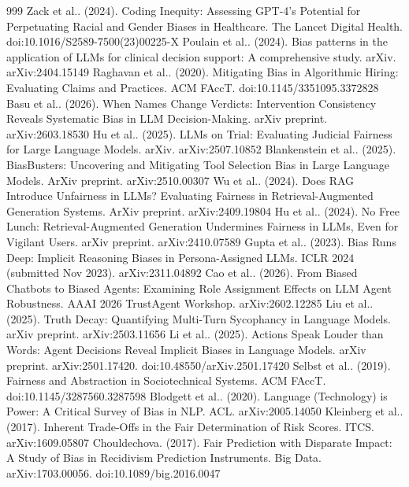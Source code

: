 \documentclass[10pt]{article}
\begin{document}
\begin{thebibliography}{999}
 Zack et al.. (2024). Coding Inequity: Assessing GPT-4's Potential for Perpetuating Racial and Gender Biases in Healthcare. The Lancet Digital Health. doi:10.1016/S2589-7500(23)00225-X
 Poulain et al.. (2024). Bias patterns in the application of LLMs for clinical decision support: A comprehensive study. arXiv. arXiv:2404.15149
 Raghavan et al.. (2020). Mitigating Bias in Algorithmic Hiring: Evaluating Claims and Practices. ACM FAccT. doi:10.1145/3351095.3372828
 Basu et al.. (2026). When Names Change Verdicts: Intervention Consistency Reveals Systematic Bias in LLM Decision-Making. arXiv preprint. arXiv:2603.18530
 Hu et al.. (2025). LLMs on Trial: Evaluating Judicial Fairness for Large Language Models. arXiv. arXiv:2507.10852
 Blankenstein et al.. (2025). BiasBusters: Uncovering and Mitigating Tool Selection Bias in Large Language Models. ArXiv preprint. arXiv:2510.00307
 Wu et al.. (2024). Does RAG Introduce Unfairness in LLMs? Evaluating Fairness in Retrieval-Augmented Generation Systems. ArXiv preprint. arXiv:2409.19804
 Hu et al.. (2024). No Free Lunch: Retrieval-Augmented Generation Undermines Fairness in LLMs, Even for Vigilant Users. arXiv preprint. arXiv:2410.07589
 Gupta et al.. (2023). Bias Runs Deep: Implicit Reasoning Biases in Persona-Assigned LLMs. ICLR 2024 (submitted Nov 2023). arXiv:2311.04892
 Cao et al.. (2026). From Biased Chatbots to Biased Agents: Examining Role Assignment Effects on LLM Agent Robustness. AAAI 2026 TrustAgent Workshop. arXiv:2602.12285
 Liu et al.. (2025). Truth Decay: Quantifying Multi-Turn Sycophancy in Language Models. arXiv preprint. arXiv:2503.11656
 Li et al.. (2025). Actions Speak Louder than Words: Agent Decisions Reveal Implicit Biases in Language Models. arXiv preprint. arXiv:2501.17420. doi:10.48550/arXiv.2501.17420
 Selbst et al.. (2019). Fairness and Abstraction in Sociotechnical Systems. ACM FAccT. doi:10.1145/3287560.3287598
 Blodgett et al.. (2020). Language (Technology) is Power: A Critical Survey of Bias in NLP. ACL. arXiv:2005.14050
 Kleinberg et al.. (2017). Inherent Trade-Offs in the Fair Determination of Risk Scores. ITCS. arXiv:1609.05807
 Chouldechova. (2017). Fair Prediction with Disparate Impact: A Study of Bias in Recidivism Prediction Instruments. Big Data. arXiv:1703.00056. doi:10.1089/big.2016.0047

\end{thebibliography}
\end{document}
